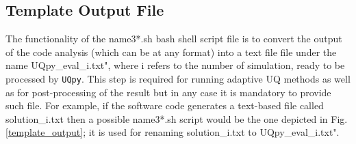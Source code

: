 \documentclass[preprint,12pt]{elsarticle}
\begin{document}
\begin{figure}[!ht]
	\caption{}
	\label{template_model}
\end{figure}



\subsection{Template Output File}

The functionality of the {\color{red} name3*.sh} bash shell script file is to convert the output of the code analysis (which can be at any format) into a text file file under the name {\color{magenta} UQpy\_eval\_i.txt"}, where {\color{magenta} i} refers to the number of simulation,  ready to be processed by \texttt{UQpy}. This step is required for running adaptive UQ methods as well as for post-processing of the result but in any case it is mandatory to provide such file. For example, if the software code generates a text-based  file called {\color{magenta} solution\_i.txt} then a possible {\color{red} name3*.sh} script would be the one depicted in Fig.\ref{template_output};  it is used for renaming {\color{magenta} solution\_i.txt} to {\color{magenta} UQpy\_eval\_i.txt"}.
\end{document}
